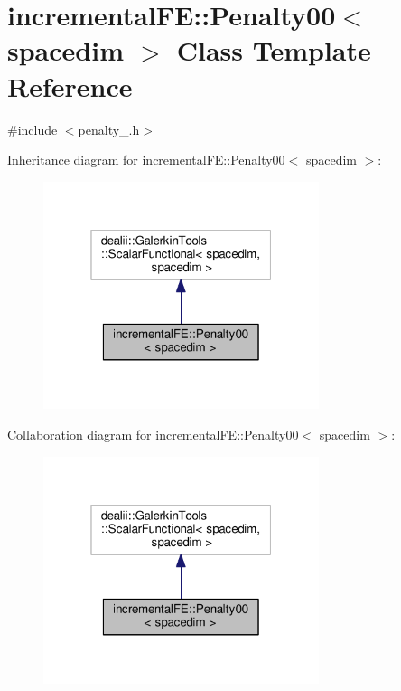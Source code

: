 \hypertarget{classincremental_f_e_1_1_penalty00}{}\section{incremental\+FE\+:\+:Penalty00$<$ spacedim $>$ Class Template Reference}
\label{classincremental_f_e_1_1_penalty00}


{\ttfamily \#include $<$penalty\+\_.\+h$>$}



Inheritance diagram for incremental\+FE\+:\+:Penalty00$<$ spacedim $>$\+:\nopagebreak
\begin{figure}[H]
\begin{center}
\leavevmode
\includegraphics[width=229pt]{classincremental_f_e_1_1_penalty00__inherit__graph}
\end{center}
\end{figure}


Collaboration diagram for incremental\+FE\+:\+:Penalty00$<$ spacedim $>$\+:\nopagebreak
\begin{figure}[H]
\begin{center}
\leavevmode
\includegraphics[width=229pt]{classincremental_f_e_1_1_penalty00__coll__graph}
\end{center}
\end{figure}
